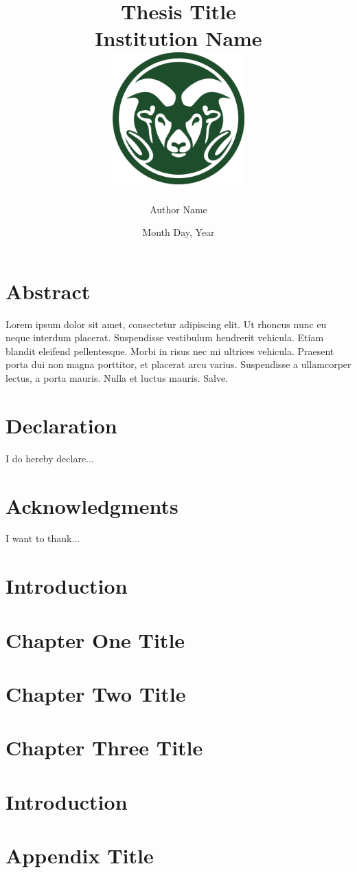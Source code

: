 \documentclass[11pt,twoside]{report}
\title{
	{Thesis Title}\\
	{\large Institution Name}\\
	{\includegraphics[width=2in]{chapter01/universitylogo.png}}
}
\author{Author Name}
\date{Month Day, Year}
\begin{document}
\maketitle
\chapter*{Abstract}
Lorem ipsum dolor sit amet, consectetur adipiscing elit. Ut rhoncus nunc eu neque interdum placerat. Suspendisse vestibulum hendrerit vehicula. Etiam blandit eleifend pellentesque. Morbi in risus nec mi ultrices vehicula. Praesent porta dui non magna porttitor, et placerat arcu varius. Suspendisse a ullamcorper lectus, a porta mauris. Nulla et luctus mauris. Salve.

\chapter*{Declaration}
I do hereby declare...

\chapter*{Acknowledgments}
I want to thank...

\tableofcontents

\chapter{Introduction}


\chapter{Chapter One Title}


\chapter{Chapter Two Title}


\chapter{Chapter Three Title}


\chapter{Introduction}


\appendix
\chapter{Appendix Title}

\end{document}
